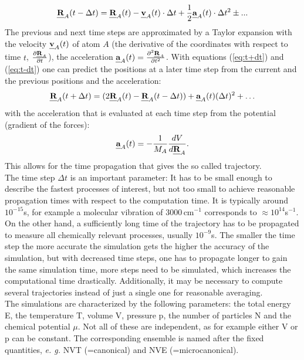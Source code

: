 \documentclass[11pt,DIV=13,BCOR=5mm,a4paper,headinclude]{scrbook}
\def\mathbi#1{\textbf{\em #1}}
\renewcommand{\vec}[1]{\mathbi{#1}}
\begin{document}
 \begin{equation}\label{eq:t-dt}
 \vec{R}_A(t-\Delta t) = \vec{R}_A(t) - \vec{v}_A(t)\cdot \Delta t + \frac{1}{2}\vec{a}_A(t)\cdot \Delta t^2 \pm ...
\end{equation}
The previous and next time steps are approximated by a Taylor expansion with the velocity $\vec{v}_A(t)$ of atom $A$ (the derivative of the coordinates with respect to time $t$, $\frac{\partial \vec{R}_A}{\partial t}$), the acceleration $\vec{a}_A(t)=\frac{\partial^2 \vec{R}_A}{\partial t^2}$.
With equations (\ref{eq:t+dt}) and (\ref{eq:t-dt}) one can predict the positions at a later time step from the current and the previous positions and the acceleration:
\begin{equation}
 \vec{R}_A(t+\Delta t)=(2\vec{R}_A(t) - \vec{R}_A(t-\Delta t)) + \vec{a}_A(t)(\Delta t)^2 + \ldots
\end{equation}
with the acceleration that is evaluated at each time step from the potential (gradient of the forces):
\begin{equation}
 \vec{a}_A(t)=-\frac{1}{M_A}\frac{dV}{d\vec{R}_A}.
\end{equation}
This allows for the time propagation that gives the so called trajectory.
\\
The time step $\Delta t$ is an important parameter: It has to be small enough to describe the fastest processes of interest, but not too small to achieve reasonable propagation times with respect to the computation time.
It is typically around $10^{-15}$s, for example a molecular vibration of $3000\,$cm$^{-1}$ corresponds to $\approx 10^{14}$s$^{-1}$.
On the other hand, a sufficiently long time of the trajectory has to be propagated to measure all chemically relevant processes, usually $10^{-9}$s.
The smaller the time step the more accurate the simulation gets the higher the accuracy of the simulation, but with decreased time steps, one has to propagate longer to gain the same simulation time, more steps need to be simulated, which increases the computational time drastically.
Additionally, it may be necessary to compute several trajectories instead of just a single one for reasonable averaging.
\\
The simulations are characterized by the following parameters: the total energy E, the temperature T, volume V, pressure p, the number of particles N and the chemical potential $\mu$.
Not all of these are independent, as for example either V or p can be constant.
The corresponding ensemble is named after the fixed quantities, \textit{e.
g.} NVT (=canonical) and NVE (=microcanonical).
\end{document}
